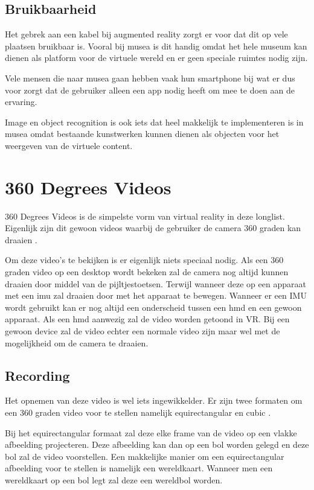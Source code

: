 \subsection{Bruikbaarheid}
Het gebrek aan een kabel bij augmented reality zorgt er voor dat dit op vele plaatsen bruikbaar is. Vooral bij musea is dit handig omdat het hele museum kan dienen als platform voor de virtuele wereld en er geen speciale ruimtes nodig zijn.

Vele mensen die naar musea gaan hebben vaak hun smartphone bij wat er dus voor zorgt dat de gebruiker alleen een app nodig heeft om mee te doen aan de ervaring.

Image en object recognition is ook iets dat heel makkelijk te implementeren is in musea omdat bestaande kunstwerken kunnen dienen als objecten voor het weergeven van de virtuele content.

\section{360 Degrees Videos}
360 Degrees Videos is de simpelste vorm van virtual reality in deze longlist. Eigenlijk zijn dit gewoon videos waarbij de gebruiker de camera 360 graden kan draaien \autocite{Hosseini2016}.

Om deze video's te bekijken is er eigenlijk niets speciaal nodig. Als een 360 graden video op een desktop wordt bekeken zal de camera nog altijd kunnen draaien door middel van de pijltjestoetsen. Terwijl wanneer deze op een apparaat met een \acrshort{imu} zal draaien door met het apparaat te bewegen. Wanneer er een IMU wordt gebruikt kan er nog altijd een onderscheid tussen een \acrshort{hmd} en een gewoon apparaat. Als een \acrshort{hmd} aanwezig zal de video worden getoond in VR. Bij een gewoon device zal de video echter een normale video zijn maar wel met de mogelijkheid om de camera te draaien.

\subsection{Recording}
Het opnemen van deze video is wel iets ingewikkelder. Er zijn twee formaten om een 360 graden video voor te stellen namelijk equirectangular en cubic \autocite{Lee2010}. 

Bij het equirectangular formaat zal deze elke frame van de video op een vlakke afbeelding projecteren. Deze afbeelding kan dan op een bol worden gelegd en deze bol zal de video voorstellen. Een makkelijke manier om een equirectangular afbeelding voor te stellen is namelijk een wereldkaart. Wanneer men een wereldkaart op een bol legt zal deze een wereldbol worden.
 
